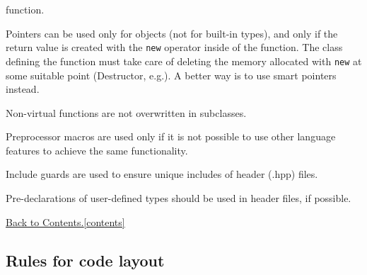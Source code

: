 \documentclass[11pt, oneside]{scrartcl}
\newcommand{\backtocontents}{\hyperref[contents]{Back to Contents.\ref*{contents}}}
\begin{document}
\begin{itemize*}
\begin{itemize*}
  function.
  \item Pointers can be used only for objects (not for built-in types), and only
  if the return value is created with the \texttt{new} operator inside of the
  function. The class defining the function must take care of deleting the memory
  allocated with \texttt{new} at some suitable point (Destructor, e.g.). A better
  way is to use smart pointers instead.
  \end{itemize*}
\item Non-virtual functions are not overwritten in subclasses.
\item Preprocessor macros are used only if it is not possible to use other
language features to achieve the same functionality.
\item Include guards are used to ensure unique includes of header (.hpp) files.
\item Pre-declarations of user-defined types should be used in header files, if
possible.
\end{itemize*}

\backtocontents

\subsection{Rules for code layout}
  
\end{document}
